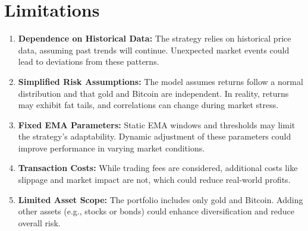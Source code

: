\section{Limitations}

\begin{enumerate}

    \item \textbf{Dependence on Historical Data:}  
    The strategy relies on historical price data, assuming past trends will continue. Unexpected market events could lead to deviations from these patterns.

    \item \textbf{Simplified Risk Assumptions:}  
    The model assumes returns follow a normal distribution and that gold and Bitcoin are independent. In reality, returns may exhibit fat tails, and correlations can change during market stress.

    \item \textbf{Fixed EMA Parameters:}  
    Static EMA windows and thresholds may limit the strategy's adaptability. Dynamic adjustment of these parameters could improve performance in varying market conditions.

    \item \textbf{Transaction Costs:}  
    While trading fees are considered, additional costs like slippage and market impact are not, which could reduce real-world profits.

    \item \textbf{Limited Asset Scope:}  
    The portfolio includes only gold and Bitcoin. Adding other assets (e.g., stocks or bonds) could enhance diversification and reduce overall risk.

\end{enumerate}
